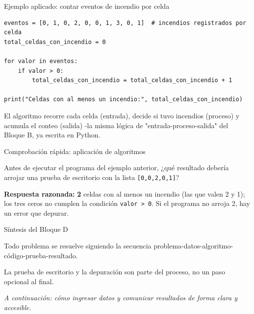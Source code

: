 \documentclass[aspectratio=169,11pt]{beamer}
\begin{document}
\begin{frame}[fragile]{Ejemplo aplicado: contar eventos de incendio por celda}
\footnotesize
\begin{lstlisting}
eventos = [0, 1, 0, 2, 0, 0, 1, 3, 0, 1]  # incendios registrados por celda
total_celdas_con_incendio = 0

for valor in eventos:
    if valor > 0:
        total_celdas_con_incendio = total_celdas_con_incendio + 1

print("Celdas con al menos un incendio:", total_celdas_con_incendio)
\end{lstlisting}
\vspace{0.1cm}
\begin{keybox}[top=2pt,bottom=2pt]
\footnotesize El algoritmo recorre cada celda (entrada), decide si tuvo incendios (proceso) y acumula el conteo (salida) -la misma lógica de "entrada-proceso-salida" del Bloque B, ya escrita en Python.
\end{keybox}
\end{frame}

\begin{frame}{Comprobación rápida: aplicación de algoritmos}
\begin{checkbox}
Antes de ejecutar el programa del ejemplo anterior, ¿qué resultado debería arrojar una prueba de escritorio con la lista \texttt{[0,0,2,0,1]}?
\end{checkbox}
\vspace{0.2cm}
\begin{keybox}[top=2pt,bottom=2pt]
\footnotesize\textbf{Respuesta razonada:} \textbf{2} celdas con al menos un incendio (las que valen 2 y 1); los tres ceros no cumplen la condición \texttt{valor > 0}. Si el programa no arroja 2, hay un error que depurar.
\end{keybox}
\end{frame}

\begin{frame}{Síntesis del Bloque D}
\begin{keybox}[top=2pt,bottom=2pt]
\footnotesize Todo problema se resuelve siguiendo la secuencia problema-datos-algoritmo-código-prueba-resultado.
\end{keybox}
\begin{keybox}[top=2pt,bottom=2pt]
\footnotesize La prueba de escritorio y la depuración son parte del proceso, no un paso opcional al final.
\end{keybox}
\vspace{0.1cm}
\textit{A continuación: cómo ingresar datos y comunicar resultados de forma clara y accesible.}
\end{frame}
\end{document}
